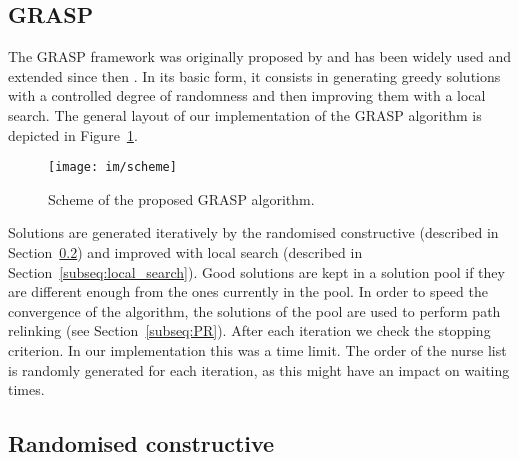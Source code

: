 \documentclass[a4paper,11pt]{elsarticle}
\begin{document}
\subsection{GRASP}

The GRASP framework was originally proposed by \cite{FEO198967} and has been widely used and extended since then \citep{resende2016optimization}. In its basic form, it consists in generating greedy solutions with a controlled degree of randomness and then improving them with a local search. The general layout of our implementation of the GRASP algorithm is depicted in Figure~\ref{fig:grasp_diagram}.

\begin{figure}[htb!]
    \centering
    \texttt{[image: im/scheme]}
    \caption{Scheme of the proposed GRASP algorithm.}
    \label{fig:grasp_diagram}
\end{figure}

Solutions are generated iteratively by the randomised constructive (described in Section~\ref{subseq:constructive}) and improved with local search (described in Section~\ref{subseq:local_search}). Good solutions are kept in a solution pool if they are different enough from the ones currently in the pool. In order to speed the convergence of the algorithm, the solutions of the pool are used to perform path relinking (see Section~\ref{subseq:PR}). After each iteration we check the stopping criterion. In our implementation this was a time limit. The order of the nurse list is randomly generated for each iteration, as this might have an impact on waiting times. 


\subsection{Randomised constructive}\label{subseq:constructive}
\end{document}
